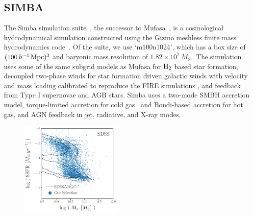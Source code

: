 \subsection{SIMBA} \label{sec:simba}
The {\sc Simba} simulation suite~\citep{dave2019}, the successor to {\sc
Mufasa}~\citep{dave2016, dave2017, dave2017a}, is a cosmological hydrodynamical
simulation constructed using the {\sc Gizmo} meshless finite mass hydrodynamics 
code~\citep{hopkins2015, hopkins2017}. Of the suite, we use
`m100n1024', which has a box size of $(100\,h^{-1}\,{\rm Mpc})^3$ and baryonic 
mass resolution of $1.82 \times 10^7\ M_\odot$. The simulation uses some of the same
subgrid models as {\sc Mufasa} for $\rm H_2$ based star formation, decoupled
two-phase winds for star formation driven galactic winds with velocity and mass loading 
calibrated to reproduce the FIRE simulations \citep{muratov2015, angles-alcazar2017b}, and feedback from 
Type I supernovae and AGB stars. {\sc Simba} uses a two-mode SMBH accretion 
model, torque-limited accretion for cold gas~\citep{angles-alcazar2017} and 
Bondi-based accretion for hot gas, and AGN feedback in jet, radiative, and
X-ray modes. %

\begin{figure}
\begin{center}
    \includegraphics[width=0.45\textwidth]{figs/sdss_selection.pdf} 
    \caption{\label{fig:sdss_sel}
    }
\end{center}
\end{figure}


